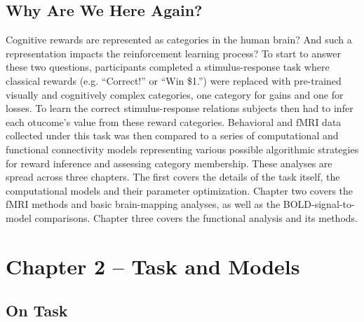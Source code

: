 \documentclass[doc,12pt]{apa}        %
\begin{document}
\subsection{Why Are We Here Again?}
\label{sub:goals}
Cognitive rewards are represented as categories in the human brain?  And such a representation impacts the reinforcement learning process?  To start to answer these two questions, participants completed a stimulus-response task where classical rewards (e.g. ``Correct!'' or ``Win \$1.'') were replaced with pre-trained visually and cognitively complex categories, one category for gains and one for losses.  To learn the correct stimulus-response relations subjects then had to infer each otucome's value from these reward categories.   Behavioral and fMRI data collected under this task was then compared to a series of computational and functional connectivity models representing various possible algorithmic strategies for reward inference and assessing category membership.  These analyses are spread across three chapters.  The first covers the details of the task itself, the computational models and their parameter optimization.  Chapter two covers the fMRI methods and basic brain-mapping analyses, as well as the BOLD-signal-to-model comparisons.  Chapter three covers the functional analysis and its methods.


\section{Chapter 2 -- Task and Models} %
\label{sec:task_and_models}
\subsection{On Task}
\label{sub:to_task}
\end{document}
